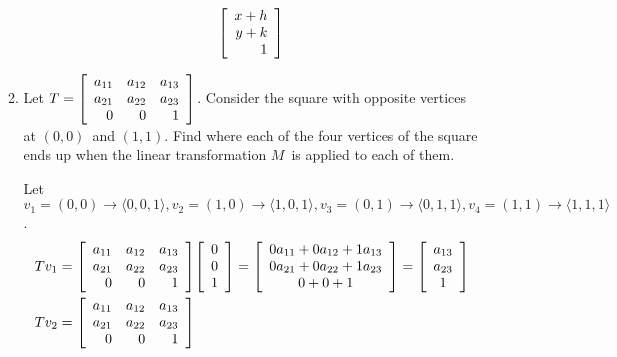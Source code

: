 \documentclass{letter}
\newcommand{\Ve}[1]{\langle #1 \rangle}
\newcommand{\?}{\stackrel{?}{=}}
\newcommand\Que[1]{%
   \leavevmode\noindent
   #1
}
\newcommand\Ans[2][]{%
   \leavevmode\noindent
   {
       \begin{mdframed}[backgroundcolor=blue!10]
       #2
       \end{mdframed}
   }
}
\newenvironment{Mat}[1]{%
  \left[\begin{array}{*{#1}{r}}
}{%
  \end{array}\right]
}
\newenvironment{Cmat}[1]{%
  \left[\begin{array}{*{#1}{c}}
}{%
  \end{array}\right]
}
\begin{document}
\begin{enumerate}
\begin{enumerate}[label=(\alph*)]
{\begin{align*}
                     \begin{Mat}{1} x+h \\ y+k \\ 1 \end{Mat}
      \end{align*}
      }
      \newpage
      \item \Que {
      Let $T=\begin{Mat}{3} a_{11} & a_{12} & a_{13} \\
                            a_{21} & a_{22} & a_{23} \\
                            0      & 0      & 1 \end{Mat}$.  Consider the square with opposite vertices at $(0,0)$\ and $(1,1)$.  Find where each of the four vertices of the square ends up when the linear transformation $M$\ is applied to each of them.
      }
      \Ans{
         Let $v_1=(0,0)\to \Ve{0,0,1}, v_2=(1,0)\to\Ve{1,0,1}, v_3=(0,1)\to\Ve{0,1,1}, v_4=(1,1)\to\Ve{1,1,1}$.
         \begin{align*}
             Tv_1 &= \begin{Mat}{3} a_{11} & a_{12} & a_{13} \\
                                    a_{21} & a_{22} & a_{23} \\
                                    0      & 0      & 1 \end{Mat}
                     \begin{Cmat}{1} 0 \\ 0 \\ 1 \end{Cmat}
                   = \begin{Cmat}{1} 0a_{11} + 0a_{12} + 1a_{13} \\
                                    0a_{21} + 0a_{22} + 1a_{23} \\
                                    0 + 0 + 1 \end{Cmat}
                   = \begin{Cmat}{1} a_{13} \\ a_{23} \\ 1 \end{Cmat} \\
             Tv_2 &= \begin{Mat}{3} a_{11} & a_{12} & a_{13} \\
                                    a_{21} & a_{22} & a_{23} \\
                                    0      & 0      & 1 \end{Mat}

\end{align*}}
\end{enumerate}
\end{enumerate}
\end{document}
